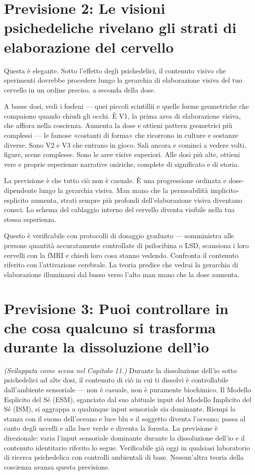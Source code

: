 \documentclass[11pt, twoside, openright]{book}
\begin{document}
\section*{Previsione 2: Le visioni psichedeliche rivelano gli strati di elaborazione del cervello}

Questa è elegante. Sotto l'effetto degli psichedelici, il contenuto visivo che sperimenti dovrebbe procedere lungo la gerarchia di elaborazione visiva del tuo cervello in un ordine preciso, a seconda della dose.

A basse dosi, vedi i fosfeni --- quei piccoli scintillii e quelle forme geometriche che compaiono quando chiudi gli occhi. È V1, la prima area di elaborazione visiva, che affiora nella coscienza. Aumenta la dose e ottieni pattern geometrici più complessi --- le famose «costanti di forma» che ricorrono in culture e sostanze diverse. Sono V2 e V3 che entrano in gioco. Sali ancora e cominci a vedere volti, figure, scene complesse. Sono le aree visive superiori. Alle dosi più alte, ottieni vere e proprie esperienze narrative oniriche, complete di significato e di storia.

La previsione è che tutto ciò non è casuale. È una progressione ordinata e dose-dipendente lungo la gerarchia visiva. Man mano che la permeabilità implicito-esplicito aumenta, strati sempre più profondi dell'elaborazione visiva diventano consci. Lo schema del cablaggio interno del cervello diventa visibile nella tua stessa esperienza.

Questo è verificabile con protocolli di dosaggio graduato --- somministra alle persone quantità accuratamente controllate di psilocibina o LSD, scansiona i loro cervelli con la fMRI e chiedi loro cosa stanno vedendo. Confronta il contenuto riferito con l'attivazione cerebrale. La teoria predice che vedrai la gerarchia di elaborazione illuminarsi dal basso verso l'alto man mano che la dose aumenta.

\section*{Previsione 3: Puoi controllare in che cosa qualcuno si trasforma durante la dissoluzione dell'io}

\textit{(Sviluppata come scena nel Capitolo 11.)} Durante la dissoluzione dell'io sotto psichedelici ad alte dosi, il contenuto di ciò in cui ti dissolvi è controllabile dall'ambiente sensoriale --- non è casuale, non è puramente biochimico. Il Modello Esplicito del Sé (ESM), sganciato dal suo abituale input del Modello Implicito del Sé (ISM), si aggrappa a qualunque input sensoriale sia dominante. Riempi la stanza con il suono dell'oceano e luce blu e il soggetto diventa l'oceano; passa al canto degli uccelli e alla luce verde e diventa la foresta. La previsione è direzionale: varia l'input sensoriale dominante durante la dissoluzione dell'io e il contenuto identitario riferito lo segue. Verificabile già oggi in qualsiasi laboratorio di ricerca psichedelica con controlli ambientali di base. Nessun'altra teoria della coscienza avanza questa previsione.
\end{document}

